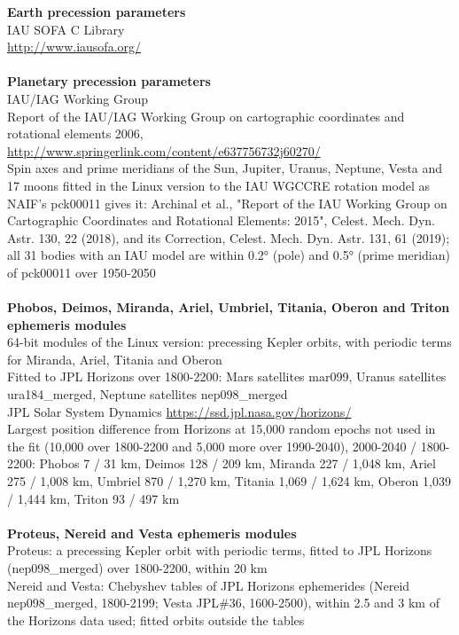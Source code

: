 \documentclass[Orbiter User Manual.tex]{subfiles}
\begin{document}
\textbf{Earth precession parameters}\\
IAU SOFA C Library\\
\url{http://www.iausofa.org/}\\
\\
\textbf{Planetary precession parameters}\\
IAU/IAG Working Group\\
Report of the IAU/IAG Working Group on cartographic coordinates and rotational elements 2006, \url{http://www.springerlink.com/content/e637756732j60270/}\\
Spin axes and prime meridians of the Sun, Jupiter, Uranus, Neptune, Vesta and 17 moons fitted in the Linux version to the IAU WGCCRE rotation model as NAIF's pck00011 gives it: Archinal et al., "Report of the IAU Working Group on Cartographic Coordinates and Rotational Elements: 2015", Celest. Mech. Dyn. Astr. 130, 22 (2018), and its Correction, Celest. Mech. Dyn. Astr. 131, 61 (2019); all 31 bodies with an IAU model are within 0.2° (pole) and 0.5° (prime meridian) of pck00011 over 1950-2050\\
\\
\textbf{Phobos, Deimos, Miranda, Ariel, Umbriel, Titania, Oberon and Triton ephemeris modules}\\
64-bit modules of the Linux version: precessing Kepler orbits, with periodic terms for Miranda, Ariel, Titania and Oberon\\
Fitted to JPL Horizons over 1800-2200: Mars satellites mar099, Uranus satellites ura184\_merged, Neptune satellites nep098\_merged\\
JPL Solar System Dynamics \url{https://ssd.jpl.nasa.gov/horizons/}\\
Largest position difference from Horizons at 15,000 random epochs not used in the fit (10,000 over 1800-2200 and 5,000 more over 1990-2040), 2000-2040 / 1800-2200: Phobos 7 / 31 km, Deimos 128 / 209 km, Miranda 227 / 1,048 km, Ariel 275 / 1,008 km, Umbriel 870 / 1,270 km, Titania 1,069 / 1,624 km, Oberon 1,039 / 1,444 km, Triton 93 / 497 km\\
\\
\textbf{Proteus, Nereid and Vesta ephemeris modules}\\
Proteus: a precessing Kepler orbit with periodic terms, fitted to JPL Horizons (nep098\_merged) over 1800-2200, within 20 km\\
Nereid and Vesta: Chebyshev tables of JPL Horizons ephemerides (Nereid nep098\_merged, 1800-2199; Vesta JPL\#36, 1600-2500), within 2.5 and 3 km of the Horizons data used; fitted orbits outside the tables\\
\end{document}
